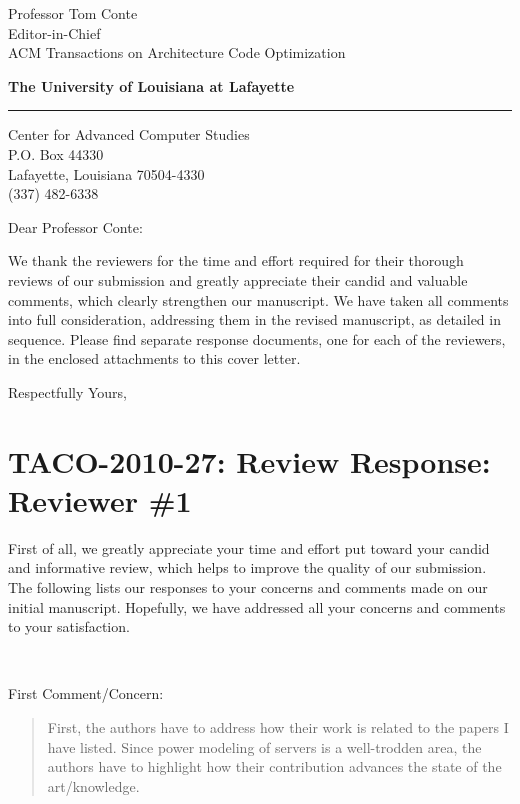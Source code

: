 \documentclass[10pt]{letter} %
\newenvironment{rviewcomment}
{~\\%
\begin{bfseries}}
{\end{bfseries}}
\begin{document}
\signature{Adam Wade Lewis}           %
\longindentation=0pt                       %
\let\raggedleft\raggedright                %
 
 
\begin{letter}{Professor Tom Conte \\
Editor-in-Chief \\
ACM Transactions on Architecture Code Optimization }


\begin{flushright}
{\hfill \large\bf The University of Louisiana at Lafayette}
\end{flushright}
\medskip\hrule height 1pt
\begin{flushright}
\hfill Center for Advanced Computer Studies\\
\hfill P.O. Box 44330 \\
\hfill Lafayette, Louisiana 70504-4330\\
\hfill (337) 482-6338 \\
\hfill {}
\end{flushright} 

 
\opening{Dear Professor Conte:} 
 
\noindent We thank the reviewers for the time and effort required for
their thorough reviews of our submission and greatly appreciate
their candid and
valuable comments, which clearly strengthen our manuscript.  We have
taken all comments into full consideration, addressing them in the
revised manuscript, as detailed in sequence.  Please find separate
response documents, one for each of the reviewers, in the enclosed
attachments to this cover letter.
 
\closing{Respectfully Yours,} 
\clearpage
\section{TACO-2010-27: Review Response: Reviewer \#1}
\label{sec-1}
First of all, we greatly appreciate your time and effort put toward
your candid and informative review, which helps to improve the quality
of our submission.  The following lists our responses to your concerns
and comments made on our initial manuscript.  Hopefully, we have addressed
all your concerns and comments to your satisfaction.

\begin{rviewcomment}
  First Comment/Concern:
\end{rviewcomment}
\begin{quote}
\begin{itshape} 
  First, the authors have to address how their work is related to the
  papers I have listed. Since power modeling of servers is a
  well-trodden area, the authors have to highlight how their
  contribution advances the state of the art/knowledge.


\end{itshape}
\end{quote}
\end{letter}
\end{document}
